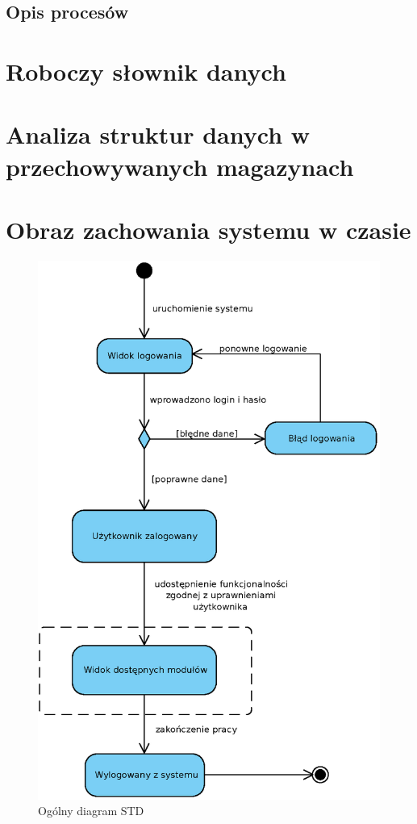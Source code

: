 \documentclass[paper=a4, fontsize=12pt]{scrartcl}
\numberwithin{equation}{section}		%
\numberwithin{figure}{section}			%
\numberwithin{table}{section}				%
\begin{document}
	\subsection{Opis procesów}
		

\section{Roboczy słownik danych}
	
	
\section{Analiza struktur danych w przechowywanych magazynach}
	

\section{Obraz zachowania systemu w czasie}

	\begin{figure}[H]
		\centering
		\includegraphics[width=.8\textwidth]{img/AD/STDmain.eps}
		\caption{Ogólny diagram STD}
	\end{figure}
\end{document}
